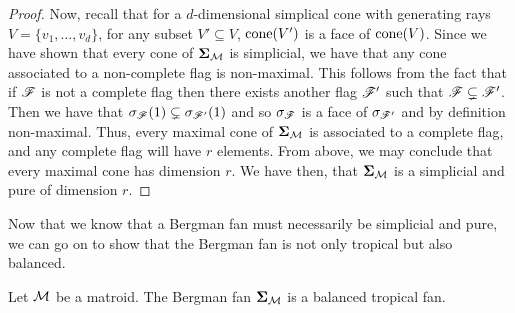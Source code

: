 \documentclass[12pt,oneside]{../../sfsuthesis}
\begin{document}
\begin{proof}
    Now, recall that for a \( d \)-dimensional simplical cone with generating rays \(  V = \{ v_1, \dots, v_d \} \), for any subset \( V' \subseteq V \),
    \( \mathrm{cone}(V') \) is a face of \( \mathrm{cone}(V) \).
    Since we have  shown that every cone of \( {\bm{\Sigma}}_{\mathcal{M}} \) is simplicial, we have that any cone associated to a non-complete flag is non-maximal.
    This follows from the fact that if \( \mathscr{F} \) is not a complete flag then there exists another flag \( \mathscr{F}' \) such that \( \mathscr{F} \subsetneq \mathscr{F}' \).
    Then we have that \( \sigma_{\mathscr{F}}(1) \subsetneq \sigma_{\mathscr{F}'}(1) \) and so \( \sigma_{\mathscr{F}} \) is a face of \( \sigma_{\mathscr{F}'} \) and by definition non-maximal.
    Thus, every maximal cone of \( {\bm{\Sigma}}_{\mathcal{M}} \) is associated to a complete flag, and any complete flag will have \( r \) elements.
    From above, we may conclude that every maximal cone has dimension \( r \).
    We have then, that \( {\bm{\Sigma}}_{\mathcal{M}} \) is a simplicial and pure of dimension \( r \).
\end{proof}
Now that we know that a Bergman fan must necessarily be simplicial and pure, we can go on to show that the Bergman fan is not only tropical but also balanced.
\begin{proposition}
    Let \( \mathcal{M} \) be a matroid.
    The Bergman fan \( {\bm{\Sigma}}_{\mathcal{M}} \) is a balanced tropical fan.
\end{proposition}
\end{document}
